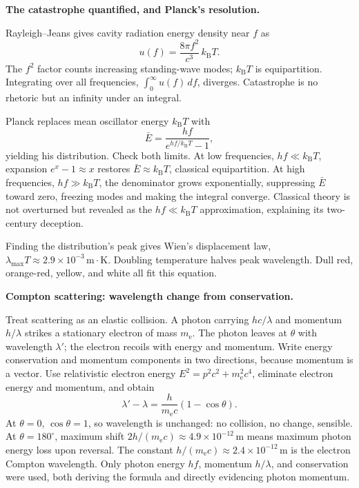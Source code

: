 \begin{mathbridge}
\textbf{The catastrophe quantified, and Planck's resolution.}

Rayleigh--Jeans gives cavity radiation energy density near \(f\) as
\[
u(f) = \frac{8\pi f^2}{c^3}\,k_{\mathrm{B}}T.
\]
The \(f^2\) factor counts increasing standing-wave modes; \(k_{\mathrm{B}}T\) is equipartition. Integrating over all frequencies, \(\int_0^\infty u(f)\,df\), diverges. Catastrophe is no rhetoric but an infinity under an integral.

Planck replaces mean oscillator energy \(k_{\mathrm{B}}T\) with
\[
\bar{E} = \frac{hf}{e^{hf/k_{\mathrm{B}}T} - 1},
\]
yielding his distribution. Check both limits. At low frequencies, \(hf \ll k_{\mathrm{B}}T\), expansion \(e^{x} - 1 \approx x\) restores \(\bar{E} \approx k_{\mathrm{B}}T\), classical equipartition. At high frequencies, \(hf \gg k_{\mathrm{B}}T\), the denominator grows exponentially, suppressing \(\bar{E}\) toward zero, freezing modes and making the integral converge. Classical theory is not overturned but revealed as the \(hf \ll k_{\mathrm{B}}T\) approximation, explaining its two-century deception.

Finding the distribution's peak gives Wien's displacement law, \(\lambda_{\max} T \approx 2.9\times10^{-3}\,\mathrm{m\cdot K}\). Doubling temperature halves peak wavelength. Dull red, orange-red, yellow, and white all fit this equation.
\end{mathbridge}

\begin{challenge}
\textbf{Compton scattering: wavelength change from conservation.}

Treat scattering as an elastic collision. A photon carrying \(hc/\lambda\) and momentum \(h/\lambda\) strikes a stationary electron of mass \(m_{\mathrm{e}}\). The photon leaves at \(\theta\) with wavelength \(\lambda'\); the electron recoils with energy and momentum. Write energy conservation and momentum components in two directions, because momentum is a vector. Use relativistic electron energy \(E^2 = p^2c^2 + m_{\mathrm{e}}^2c^4\), eliminate electron energy and momentum, and obtain
\[
\lambda' - \lambda = \frac{h}{m_{\mathrm{e}}c}(1 - \cos\theta).
\]
At \(\theta = 0\), \(\cos\theta = 1\), so wavelength is unchanged: no collision, no change, sensible. At \(\theta = 180^\circ\), maximum shift \(2h/(m_{\mathrm{e}}c) \approx 4.9\times10^{-12}\,\mathrm{m}\) means maximum photon energy loss upon reversal. The constant \(h/(m_{\mathrm{e}}c) \approx 2.4\times10^{-12}\,\mathrm{m}\) is the electron Compton wavelength. Only photon energy \(hf\), momentum \(h/\lambda\), and conservation were used, both deriving the formula and directly evidencing photon momentum.
\end{challenge}

